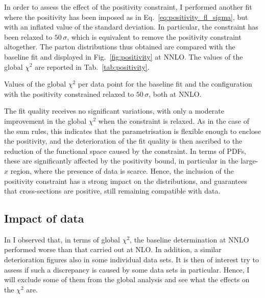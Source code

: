 In order to assess the effect of the positivity constraint, I performed another fit where the positivity has been imposed as in Eq.~\eqref{eq:positivity_fl_sigma}, but with an inflated value of the standard deviation. In particular, the constraint has been relaxed to $50 \, \sigma$, which is equivalent to remove the positivity constraint altogether. The parton distributions thus obtained are compared with the baseline fit and displayed in Fig.~\ref{fig:positivity} at NNLO. The values of the global $\chi^2$ are reported in Tab.~\ref{tab:positivity}.%

\begin{table}[t]
  \centering
  \small
  
  \caption{
    \small
    Values of the global $\chi^2$ per data point for the baseline fit and the configuration with the positivity constrained relaxed to $50 \, \sigma$, both at NNLO.}
  \label{tab:positivity}
\end{table}

The fit quality receives no significant variations, with only a moderate improvement in the global $\chi^2$ when the constraint is relaxed. As in the case of the sum rules, this indicates that the parametrisation is flexible enough to enclose the positivity, and the deterioration of the fit quality is then ascribed to the reduction of the functional space caused by the constraint. In terms of PDFs, these are significantly affected by the positivity bound, in particular in the large-$x$ region, where the presence of data is scarce. Hence, the inclusion of the positivity constraint has a strong impact on the distributions, and guarantees that cross-sections are positive, still remaining compatible with data.

\subsection{Impact of data}
\label{sec:study_data}

In  I observed that, in terms of global $\chi^2$, the baseline determination at NNLO performed worse than that carried out at NLO. In addition, a similar deterioration figures also in some individual data sets. It is then of interest try to assess if such a discrepancy is caused by some data sets in particular. Hence, I will exclude some of them from the global analysis and see what the effects on the $\chi^2$ are.%


